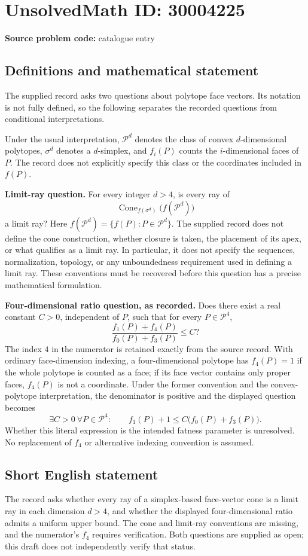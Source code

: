 \documentclass[11pt]{article}
\begin{document}
\section*{UnsolvedMath ID: 30004225}
\textbf{Source problem code:} catalogue entry
\subsection{Definitions and mathematical statement}
The supplied record asks two questions about polytope face vectors. Its notation is not fully defined, so the following separates the recorded questions from conditional interpretations.

Under the usual interpretation, \(\mathcal P^d\) denotes the class of convex \(d\)-dimensional polytopes, \(\sigma^d\) denotes a \(d\)-simplex, and \(f_i(P)\) counts the \(i\)-dimensional faces of \(P\). The record does not explicitly specify this class or the coordinates included in \(f(P)\).

\textbf{Limit-ray question.} For every integer \(d>4\), is every ray of
\[
\operatorname{Cone}_{f(\sigma^d)}\bigl(f(\mathcal P^d)\bigr)
\]
a limit ray? Here \(f(\mathcal P^d)=\{f(P):P\in\mathcal P^d\}\). The supplied record does not define the cone construction, whether closure is taken, the placement of its apex, or what qualifies as a limit ray. In particular, it does not specify the sequences, normalization, topology, or any unboundedness requirement used in defining a limit ray. These conventions must be recovered before this question has a precise mathematical formulation.

\textbf{Four-dimensional ratio question, as recorded.} Does there exist a real constant \(C>0\), independent of \(P\), such that for every \(P\in\mathcal P^4\),
\[
\frac{f_1(P)+f_4(P)}{f_0(P)+f_3(P)}\le C?
\]
The index \(4\) in the numerator is retained exactly from the source record. With ordinary face-dimension indexing, a four-dimensional polytope has \(f_4(P)=1\) if the whole polytope is counted as a face; if its face vector contains only proper faces, \(f_4(P)\) is not a coordinate. Under the former convention and the convex-polytope interpretation, the denominator is positive and the displayed question becomes
\[
\exists C>0\ \forall P\in\mathcal P^4:\qquad
f_1(P)+1\le C\bigl(f_0(P)+f_3(P)\bigr).
\]
Whether this literal expression is the intended fatness parameter is unresolved. No replacement of \(f_4\) or alternative indexing convention is assumed.
\subsection{Short English statement}
The record asks whether every ray of a simplex-based face-vector cone is a limit ray in each dimension \(d>4\), and whether the displayed four-dimensional ratio admits a uniform upper bound. The cone and limit-ray conventions are missing, and the numerator's \(f_4\) requires verification. Both questions are supplied as open; this draft does not independently verify that status.
\end{document}
